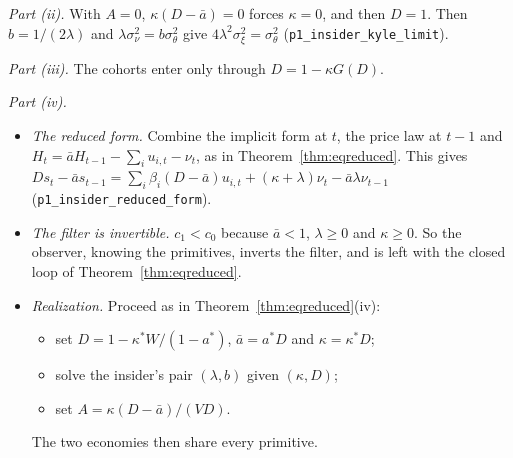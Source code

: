 \emph{Part (ii).} With $A=0$, $\kappa(D-\bar a)=0$ forces $\kappa=0$, and then $D=1$. Then $b=1/(2\lambda)$ and $\lambda\sigma_\nu^2=b\sigma_\theta^2$ give $4\lambda^2\sigma_\xi^2=\sigma_\theta^2$ (\nolinkurl{p1_insider_kyle_limit}).

\emph{Part (iii).} The cohorts enter only through $D=1-\kappa G(D)$.

\emph{Part (iv).}
\begin{itemize}[itemsep=1pt,topsep=2pt]
\item \emph{The reduced form.} Combine the implicit form at $t$, the price law at $t-1$ and $H_t=\bar aH_{t-1}-\sum_iu_{i,t}-\nu_t$, as in Theorem~\ref{thm:eqreduced}. This gives $Ds_t-\bar as_{t-1}=\sum_i\beta_i(D-\bar a)u_{i,t}+(\kappa+\lambda)\nu_t-\bar a\lambda\nu_{t-1}$ (\nolinkurl{p1_insider_reduced_form}).
\item \emph{The filter is invertible.} $c_1<c_0$ because $\bar a<1$, $\lambda\ge0$ and $\kappa\ge0$. So the observer, knowing the primitives, inverts the filter, and is left with the closed loop of Theorem~\ref{thm:eqreduced}.
\item \emph{Realization.} Proceed as in Theorem~\ref{thm:eqreduced}(iv):
 \begin{itemize}[itemsep=1pt,topsep=2pt]
 \item set $D=1-\kappa^*W/(1-a^*)$, $\bar a=a^*D$ and $\kappa=\kappa^*D$;
 \item solve the insider's pair $(\lambda,b)$ given $(\kappa,D)$;
 \item set $A=\kappa(D-\bar a)/(VD)$.
 \end{itemize}
 The two economies then share every primitive.
\end{itemize}

